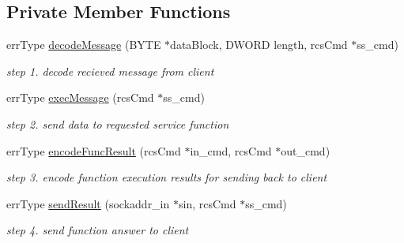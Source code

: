 \subsection*{Private Member Functions}
\begin{DoxyCompactItemize}
\item 
errType \hyperlink{classsrvAppLayer_a6d25c00bad6412988de50d868f7b6beb}{decodeMessage} (BYTE $\ast$dataBlock, DWORD length, rcsCmd $\ast$ss\_\-cmd)
\begin{DoxyCompactList}\small\item\em step 1. decode recieved message from client \item\end{DoxyCompactList}\item 
errType \hyperlink{classsrvAppLayer_a905b6d497e0e06a59c172863057fded8}{execMessage} (rcsCmd $\ast$ss\_\-cmd)
\begin{DoxyCompactList}\small\item\em step 2. send data to requested service function \item\end{DoxyCompactList}\item 
errType \hyperlink{classsrvAppLayer_a8b24fc169b1da7445a6429abb66d84f9}{encodeFuncResult} (rcsCmd $\ast$in\_\-cmd, rcsCmd $\ast$out\_\-cmd)
\begin{DoxyCompactList}\small\item\em step 3. encode function execution results for sending back to client \item\end{DoxyCompactList}\item 
errType \hyperlink{classsrvAppLayer_aed49ea99073088a26f98122a0e057c01}{sendResult} (sockaddr\_\-in $\ast$sin, rcsCmd $\ast$ss\_\-cmd)
\begin{DoxyCompactList}\small\item\em step 4. send function answer to client \item\end{DoxyCompactList}\end{DoxyCompactItemize}
